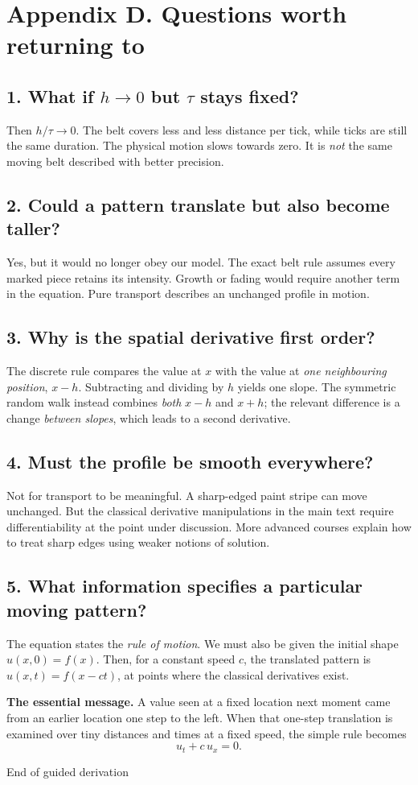 \documentclass[11pt,a4paper]{article}
\newcommand{\substart}[1]{\Needspace{5\baselineskip}\subsection{#1}}
\begin{document}
\section*{Appendix D. Questions worth returning to}
\substart{1. What if $h\to0$ but $\tau$ stays fixed?}
Then $h/\tau\to0$. The belt covers less and less distance per tick, while ticks are still the same duration. The physical motion slows towards zero. It is \emph{not} the same moving belt described with better precision.

\substart{2. Could a pattern translate but also become taller?}
Yes, but it would no longer obey our model. The exact belt rule assumes every marked piece retains its intensity. Growth or fading would require another term in the equation. Pure transport describes an unchanged profile in motion.

\substart{3. Why is the spatial derivative first order?}
The discrete rule compares the value at $x$ with the value at \emph{one neighbouring position}, $x-h$. Subtracting and dividing by $h$ yields one slope. The symmetric random walk instead combines \emph{both} $x-h$ and $x+h$; the relevant difference is a change \emph{between slopes}, which leads to a second derivative.

\substart{4. Must the profile be smooth everywhere?}
Not for transport to be meaningful. A sharp-edged paint stripe can move unchanged. But the classical derivative manipulations in the main text require differentiability at the point under discussion. More advanced courses explain how to treat sharp edges using weaker notions of solution.

\substart{5. What information specifies a particular moving pattern?}
The equation states the \emph{rule of motion}. We must also be given the initial shape $u(x,0)=f(x)$. Then, for a constant speed $c$, the translated pattern is $u(x,t)=f(x-ct)$, at points where the classical derivatives exist.

\begin{pointbox}
\textbf{The essential message.} A value seen at a fixed location next moment came from an earlier location one step to the left. When that one-step translation is examined over tiny distances and times at a fixed speed, the simple rule becomes
\[
\boxed{u_t+c\,u_x=0.}
\]
\end{pointbox}
\vfill
\begin{center}\small\color{muted} End of guided derivation\end{center}
\end{document}
